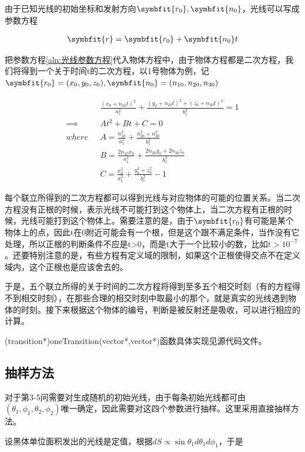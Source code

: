 \documentclass[10pt, a4paper]{article}
\newcommand\vbf{\symbfit}
\begin{document}
    由于已知光线的初始坐标和发射方向$\vbf{r_0},\vbf{n_0}$，光线可以写成参数方程

    \begin{align}\label{aln:光线参数方程}
        \vbf{r}=\vbf{r_0}+\vbf{n_0}t
    \end{align}

    把参数方程\ref{aln:光线参数方程}代入物体方程中，由于物体方程都是二次方程，我们将得到一个关于时间t的二次方程，以1号物体为例，记
    $\vbf{r_0}=(x_0,y_0,z_0),\vbf{n_0}=(n_{10},n_{20},n_{30})$

    \begin{align*}
        &\frac{(x_0+n_{10}t)^2}{a_1^2}+\frac{(y_0+n_{20}t)^2+(z_0+n_{30}t)^2}{b_1^2}=1\\
        \implies & A t^2+Bt+C=0\\
        where\text{ }& A=\frac{n_{10}^2}{a_1^2}+\frac{n_{20}^2+n_{30}^2}{b_1^2}\\
        &B=\frac{2n_{10}x_0}{a_1^2}+\frac{2n_{20}y_0+2n_{30}z_0}{b_1^2}\\
        &C=\frac{x_{0}^2}{a_1^2}+\frac{y_{0}^2+z_{0}^2}{b_1^2}-1
    \end{align*}

    每个联立所得到的二次方程都可以得到光线与对应物体的可能的位置关系。当二次方程没有正根的时候，表示光线不可能打到这个物体上，当二次方程有正根的时候，光线可能打到这个物体上。需要注意的是，由于$\vbf{r_0}$有可能是某个物体上的点，因此t在0附近可能会有一个根，但是这个跟不满足条件，当作没有它处理，所以正根的判断条件不应是t>0，而是t大于一个比较小的数，比如$t>10^{-7}$。还要特别注意的是，有些方程有定义域的限制，如果这个正根使得交点不在定义域内，这个正根也是应该舍去的。

    于是，五个联立所得的关于时间的二次方程将得到至多五个相交时刻（有的方程得不到相交时刻），在那些合理的相交时刻中取最小的那个，就是真实的光线遇到物体的时刻。接下来根据这个物体的编号，判断是被反射还是吸收，可以进行相应的计算。

    (transition*)oneTransition(vector*,vector*)函数具体实现见源代码文件。

    \subsection{抽样方法}

    对于第3-5问需要对生成随机的初始光线，由于每条初始光线都可由$(\theta_1,\phi_1,\theta_2,\phi_2)$唯一确定，因此需要对这四个参数进行抽样。这里采用直接抽样方法。

    设黑体单位面积发出的光线是定值，根据$dS\varpropto \sin\theta_1 d\theta_1 d\phi_1$，于是
\end{document}
